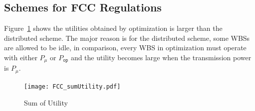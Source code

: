 \documentclass[times]{ettauth}
\theoremstyle{mytheoremstyle}
\theoremstyle{mytheoremstyle}
\theoremstyle{mytheoremstyle}
\begin{document}
%



\subsection{Schemes for FCC Regulations}
\label{performance_FCC}

Figure~\ref{sumOfUtility} shows the utilities obtained by optimization is larger than the distributed scheme.
The major reason is for the distributed scheme, some WBSs are allowed to be idle, in comparison, every WBS in optimization must operate with either $P_\mu$ or  $P_{\mathtt{op}}$ and the utility becomes large when the transmission power is $P_\mu$.
\begin{figure}[h!]
  \centering
      \texttt{[image: FCC\_sumUtility.pdf]}
  		\caption{Sum of Utility}
     \label{sumOfUtility}
\end{figure}
\end{document}
